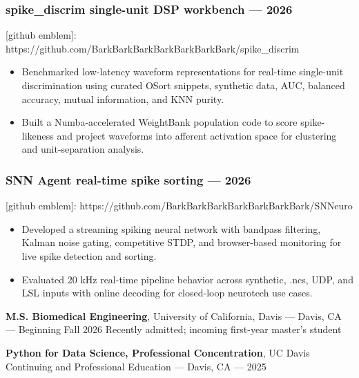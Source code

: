 \documentclass[11pt]{article}
\providecommand{\tightlist}{\setlength{\itemsep}{0pt}\setlength{\parskip}{0pt}}
\renewcommand{\subsection}[1]{\par\medskip\noindent{\sffamily\bfseries\fontsize{11pt}{0}\selectfont #1}\par\smallskip}
\begin{document}
\subsubsection{spike\_discrim single-unit DSP workbench ---
2026}\label{spike_discrim-single-unit-dsp-workbench-2026}

{[}github emblem{]}:
https://github.com/BarkBarkBarkBarkBarkBarkBark/spike\_discrim

\begin{itemize}
\tightlist
\item
  Benchmarked low-latency waveform representations for real-time
  single-unit discrimination using curated OSort snippets, synthetic
  data, AUC, balanced accuracy, mutual information, and KNN purity.
\item
  Built a Numba-accelerated WeightBank population code to score
  spike-likeness and project waveforms into afferent activation space
  for clustering and unit-separation analysis.
\end{itemize}

\subsubsection{SNN Agent real-time spike sorting ---
2026}\label{snn-agent-real-time-spike-sorting-2026}

{[}github emblem{]}:
https://github.com/BarkBarkBarkBarkBarkBarkBark/SNNeuro

\begin{itemize}
\tightlist
\item
  Developed a streaming spiking neural network with bandpass filtering,
  Kalman noise gating, competitive STDP, and browser-based monitoring
  for live spike detection and sorting.
\item
  Evaluated 20 kHz real-time pipeline behavior across synthetic, .ncs,
  UDP, and LSL inputs with online decoding for closed-loop neurotech use
  cases.
\end{itemize}

\subsection{Education}\label{education}

\textbf{M.S. Biomedical Engineering}, University of California, Davis
--- Davis, CA --- Beginning Fall 2026 Recently admitted; incoming
first-year master's student

\textbf{Python for Data Science, Professional Concentration}, UC Davis
Continuing and Professional Education --- Davis, CA --- 2025
\end{document}
